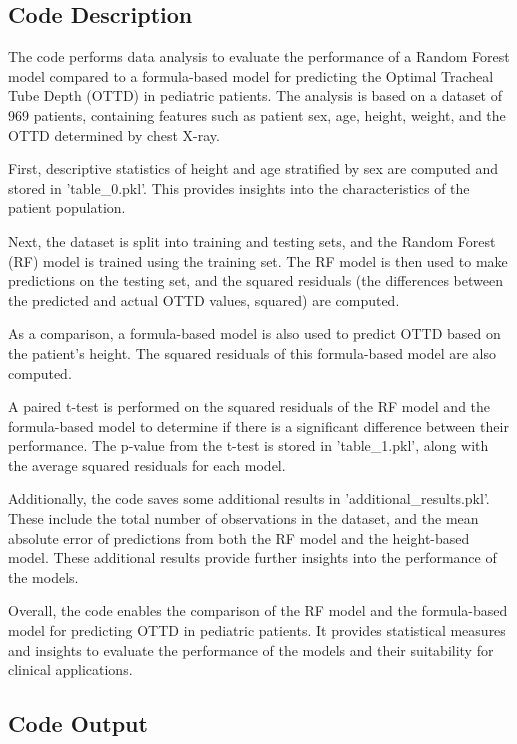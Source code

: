 \documentclass[11pt]{article}
\begin{document}
\subsection{Code Description}

The code performs data analysis to evaluate the performance of a Random Forest model compared to a formula-based model for predicting the Optimal Tracheal Tube Depth (OTTD) in pediatric patients. The analysis is based on a dataset of 969 patients, containing features such as patient sex, age, height, weight, and the OTTD determined by chest X-ray.

First, descriptive statistics of height and age stratified by sex are computed and stored in 'table\_0.pkl'. This provides insights into the characteristics of the patient population.

Next, the dataset is split into training and testing sets, and the Random Forest (RF) model is trained using the training set. The RF model is then used to make predictions on the testing set, and the squared residuals (the differences between the predicted and actual OTTD values, squared) are computed.

As a comparison, a formula-based model is also used to predict OTTD based on the patient's height. The squared residuals of this formula-based model are also computed.

A paired t-test is performed on the squared residuals of the RF model and the formula-based model to determine if there is a significant difference between their performance. The p-value from the t-test is stored in 'table\_1.pkl', along with the average squared residuals for each model.

Additionally, the code saves some additional results in 'additional\_results.pkl'. These include the total number of observations in the dataset, and the mean absolute error of predictions from both the RF model and the height-based model. These additional results provide further insights into the performance of the models.

Overall, the code enables the comparison of the RF model and the formula-based model for predicting OTTD in pediatric patients. It provides statistical measures and insights to evaluate the performance of the models and their suitability for clinical applications.

\subsection{Code Output}
\end{document}
